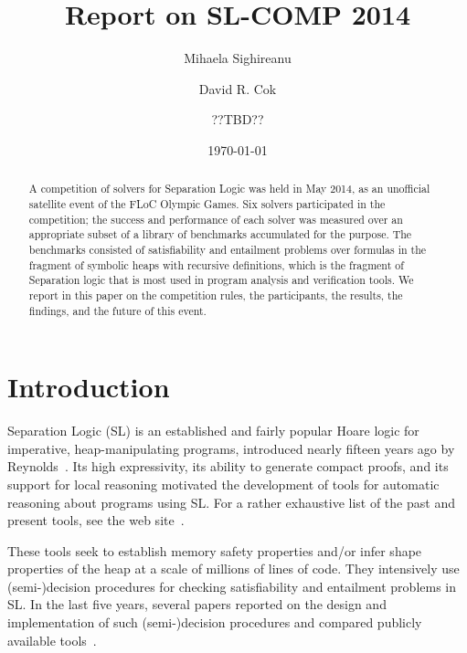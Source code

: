 \documentclass{llncs}
\title{Report on SL-COMP 2014}
\author{Mihaela Sighireanu\inst{1} \and David R. Cok\inst{2} \and ??TBD?? }
\institute{University Paris Diderot and CNRS \and GrammaTech, Inc.}
\date{\today}
\begin{document}
\sloppy
\maketitle


\begin{abstract}
A competition of solvers for Separation Logic 
was held in May 2014, 
as an unofficial satellite event of the FLoC Olympic Games.
Six solvers participated in the competition; the success and performance
of each solver was measured over an appropriate subset of a library of benchmarks
accumulated for the purpose.
The benchmarks consisted of satisfiability and entailment problems
over formulas in the fragment of symbolic heaps with recursive definitions, 
which is the fragment of Separation logic that is most used in program analysis and verification tools.
We report in this paper on 
the competition rules, the participants, the results, the findings, and  
the future of this event.
\end{abstract}


\section{Introduction}

Separation Logic (SL) is an established and fairly popular Hoare logic 
for imperative, heap-manipulating programs, 
introduced nearly fifteen years ago by Reynolds~\cite{Reynolds99,OHearnRY01,Reynolds02}. 
%
Its high expressivity, its ability to generate compact proofs, and 
its support for local reasoning 
motivated the development of tools for automatic reasoning about programs using SL.
For a rather exhaustive list of the past and present tools, see the web site~\cite{OHearn-SLsite}.

These tools seek to establish memory safety properties and/or infer shape properties of the heap at a scale of millions of lines of code.
They intensively use (semi-)decision procedures for checking satisfiability and entailment problems in SL.
In the last five years, several papers reported on the design and implementation of such (semi-)decision procedures and compared publicly available tools~\cite{HasseIOP13}.
\end{document}
